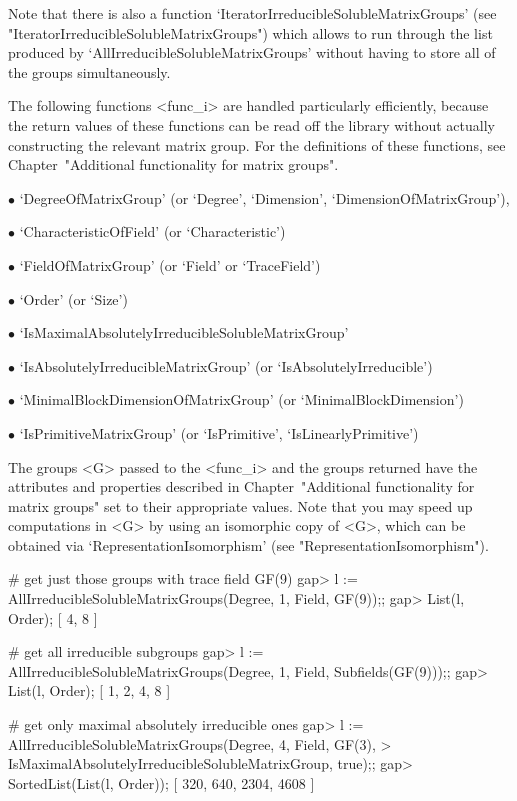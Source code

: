 Note that there is also a function `IteratorIrreducibleSolubleMatrixGroups' (see
"IteratorIrreducibleSolubleMatrixGroups") which allows to run through the list produced by
`AllIrreducibleSolubleMatrixGroups' without having to store all of the groups
simultaneously.

The following functions <func_i> are handled particularly efficiently, because the
return values of these functions can be read off the
{\IRREDSOL} library without actually constructing the relevant matrix group. For the
definitions of these functions, see Chapter~"Additional functionality for matrix
groups".

\beginlist

\item{$\bullet$} `DegreeOfMatrixGroup' (or `Degree', `Dimension',
`DimensionOfMatrixGroup'), 
\item{$\bullet$} `CharacteristicOfField' (or `Characteristic')
\item{$\bullet$} `FieldOfMatrixGroup' (or `Field' or `TraceField')
\item{$\bullet$} `Order' (or `Size')
\item{$\bullet$} `IsMaximalAbsolutelyIrreducibleSolubleMatrixGroup' 
\item{$\bullet$} `IsAbsolutelyIrreducibleMatrixGroup' (or
`IsAbsolutelyIrreducible')
\item{$\bullet$} `MinimalBlockDimensionOfMatrixGroup' (or
`MinimalBlockDimension')
\item{$\bullet$} `IsPrimitiveMatrixGroup' (or `IsPrimitive',
`IsLinearlyPrimitive')

\endlist
The groups <G> passed to the <func_i> and the groups returned have the attributes and properties described in 
Chapter~"Additional functionality for matrix groups" set to their appropriate values.
Note that you may speed up computations in <G> by using an isomorphic copy of <G>, which can be obtained via `RepresentationIsomorphism' (see "RepresentationIsomorphism").

\beginexample
# get just those groups with trace field GF(9)
gap> l := AllIrreducibleSolubleMatrixGroups(Degree, 1, Field, GF(9));;
gap> List(l, Order);
[ 4, 8 ]

# get all irreducible subgroups
gap> l := AllIrreducibleSolubleMatrixGroups(Degree, 1, Field, Subfields(GF(9)));;
gap> List(l, Order);
[ 1, 2, 4, 8 ]

# get only maximal absolutely irreducible ones
gap> l := AllIrreducibleSolubleMatrixGroups(Degree, 4, Field, GF(3),
>             IsMaximalAbsolutelyIrreducibleSolubleMatrixGroup, true);;
gap> SortedList(List(l, Order));
[ 320, 640, 2304, 4608 ]

